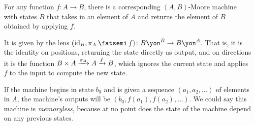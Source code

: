\documentclass[Book-Poly]{subfiles}
\begin{document}
\begin{example}\label{ex.funs_to_moore}
For any function $f\colon A\to B$, there is a corresponding $(A,B)$-Moore machine with states $B$ that takes in an element of $A$ and returns the element of $B$ obtained by applying $f$.

It is given by the lens $(\id_B, \pi_A\then f)\colon B\yon^B\to B\yon^A$. That is, it is the identity on positions, returning the state directly as output, and on directions it is the function $B\times A\xrightarrow{\pi_A}A\xrightarrow{f} B$, which ignores the current state and applies $f$ to the input to compute the new state.

If the machine begins in state $b_0$ and is given a sequence $(a_1,a_2,\ldots)$ of elements in $A$, the machine's outputs will be $(b_0,f(a_1),f(a_2),\ldots)$. We could say this machine is \emph{memoryless}, because at no point does the state of the machine depend on any previous states.
\end{example}
\end{document}
